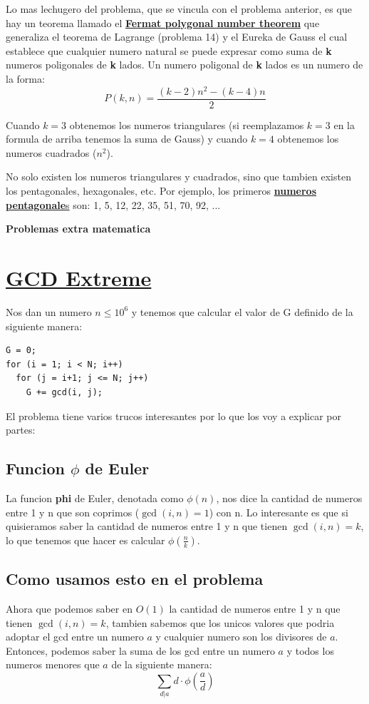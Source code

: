 \documentclass{article}
\begin{document}
Lo mas lechugero del problema, que se vincula con el problema anterior, es que hay un teorema llamado el \href{https://en.wikipedia.org/wiki/Fermat_polygonal_number_theorem}{\textbf{Fermat polygonal number theorem}} que generaliza el teorema de Lagrange (problema 14) y el Eureka de Gauss el cual establece que cualquier numero natural se puede expresar como suma de \textbf{k} numeros poligonales de \textbf{k} lados. Un numero poligonal de \textbf{k} lados es un numero de la forma:
\[P(k, n) = \frac{(k - 2)n^2 - (k - 4)n}{2}\]

Cuando $k = 3$ obtenemos los numeros triangulares (si reemplazamos $k = 3$ en la formula de arriba tenemos la suma de Gauss) y cuando $k = 4$ obtenemos los numeros cuadrados ($n^2$). 

No solo existen los numeros triangulares y cuadrados, sino que tambien existen los pentagonales, hexagonales, etc. Por ejemplo, los primeros \href{https://en.wikipedia.org/wiki/Pentagonal_number}{\textbf{numeros pentagonale}s} son: 1, 5, 12, 22, 35, 51, 70, 92, ...

\newpage
\begin{center}
    {\huge \textbf{Problemas extra matematica}}
\end{center}
\section{\href{https://www.spoj.com/problems/GCDEX/}{GCD Extreme}}
Nos dan un numero $n \leq 10^6$ y tenemos que calcular el valor de G definido de la siguiente manera:
\begin{lstlisting}[caption=Definicion de G]
G = 0;
for (i = 1; i < N; i++)
  for (j = i+1; j <= N; j++) 
    G += gcd(i, j);
\end{lstlisting}

El problema tiene varios trucos interesantes por lo que los voy a explicar por partes:
\subsection{Funcion $\phi$ de Euler}
La funcion \textbf{phi} de Euler, denotada como $\phi(n)$, nos dice la cantidad de numeros entre 1 y n que son coprimos ($\gcd(i, n) = 1$) con n. Lo interesante es que si quisieramos saber la cantidad de numeros entre 1 y n que tienen $\gcd(i, n) = k$, lo que tenemos que hacer es calcular $\phi(\frac{n}{k})$.
\subsection{Como usamos esto en el problema}
Ahora que podemos saber en $O(1)$ la cantidad de numeros entre 1 y n que tienen $\gcd(i, n) = k$, tambien sabemos que los unicos valores que podria adoptar el gcd entre un numero $a$ y cualquier numero son los divisores de $a$. Entonces, podemos saber la suma de los gcd entre un numero $a$ y todos los numeros menores que $a$ de la siguiente manera:
\[\sum_{d | a} d \cdot \phi(\frac{a}{d})\]
\end{document}
